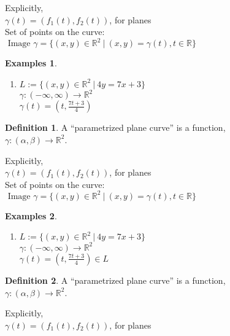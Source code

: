 \documentclass[twocolumn,20pt,fleqn]{extarticle}
\theoremstyle{plain}
\theoremstyle{definition}
\newtheorem*{definition}{Definition}
\newtheorem*{exmpls}{Examples}
\theoremstyle{remark}
\newenvironment*{examples}{\begin{exmpls} ~ \begin{enumerate}}{\end{enumerate}\end{exmpls}}
\begin{document}
Explicitly,\\
$\gamma(t) = (f_1(t), f_2(t))$, for planes\\

Set of points on the curve:\\  $\textrm{ Image } \gamma = \{(x,y) \in \mathbb{R}^2 \ |\ (x,y) = \gamma(t), t \in \mathbb{R}\}$




\begin{examples}
  \item $L:=\{(x,y) \in \mathbb{R}^2\ |\ 4y = 7x + 3\}$\\
  $\gamma  : (-\infty,\infty) \to \mathbb{R}^2$ \\
  $\gamma(t) = (t, \frac{7t+3}{4}) $\end{examples}


\clearpage




\begin{definition}
  A  ``parametrized plane curve''  is a  function,\\ $\gamma  : (\alpha, \beta) \to \mathbb{R}^2$.
\end{definition}

Explicitly,\\
$\gamma(t) = (f_1(t), f_2(t))$, for planes\\

Set of points on the curve:\\  $\textrm{ Image } \gamma = \{(x,y) \in \mathbb{R}^2 \ |\ (x,y) = \gamma(t), t \in \mathbb{R}\}$




\begin{examples}
  \item $L:=\{(x,y) \in \mathbb{R}^2\ |\ 4y = 7x + 3\}$\\
  $\gamma  : (-\infty,\infty) \to \mathbb{R}^2$ \\
  $\gamma(t) = (t, \frac{7t+3}{4})  \in L$\\\end{examples}


\clearpage




\begin{definition}
  A  ``parametrized plane curve''  is a  function,\\ $\gamma  : (\alpha, \beta) \to \mathbb{R}^2$.
\end{definition}

Explicitly,\\
$\gamma(t) = (f_1(t), f_2(t))$, for planes\\
\end{document}

